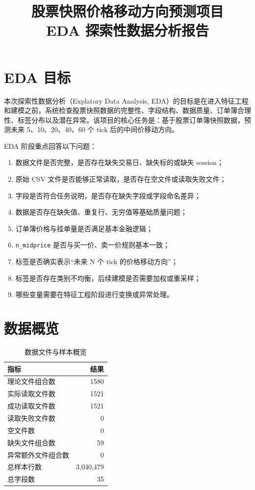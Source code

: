 \documentclass[UTF8,a4paper,12pt]{ctexart}
\title{股票快照价格移动方向预测项目\\EDA 探索性数据分析报告}
\author{}
\date{}
\begin{document}
\maketitle

\section{EDA 目标}

本次探索性数据分析（Explatory Data Analysis, EDA）的目标是在进入特征工程和建模之前，系统检查股票快照数据的完整性、字段结构、数据质量、订单簿合理性、标签分布以及潜在异常。该项目的核心任务是：基于股票订单簿快照数据，预测未来 5、10、20、40、60 个 tick 后的中间价移动方向。

EDA 阶段重点回答以下问题：

\begin{enumerate}
    \item 数据文件是否完整，是否存在缺失交易日、缺失标的或缺失 session；
    \item 原始 CSV 文件是否能够正常读取，是否存在空文件或读取失败文件；
    \item 字段是否符合任务说明，是否存在缺失字段或字段命名差异；
    \item 数据是否存在缺失值、重复行、无穷值等基础质量问题；
    \item 订单簿价格与挂单量是否满足基本金融逻辑；
    \item \texttt{n\_midprice} 是否与买一价、卖一价规则基本一致；
    \item 标签是否确实表示“未来 N 个 tick 的价格移动方向”；
    \item 标签是否存在类别不均衡，后续建模是否需要加权或重采样；
    \item 哪些变量需要在特征工程阶段进行变换或异常处理。
\end{enumerate}

\section{数据概览}

\begin{table}[H]
\centering
\caption{数据文件与样本概览}
\begin{tabular}{lr}
\toprule
指标 & 结果 \\
\midrule
理论文件组合数 & 1580 \\
实际读取文件数 & 1521 \\
成功读取文件数 & 1521 \\
读取失败文件数 & 0 \\
空文件数 & 0 \\
缺失文件组合数 & 59 \\
异常额外文件组合数 & 0 \\
总样本行数 & 3,040,479 \\
总字段数 & 35 \\
\bottomrule
\end{tabular}
\end{table}
\end{document}
